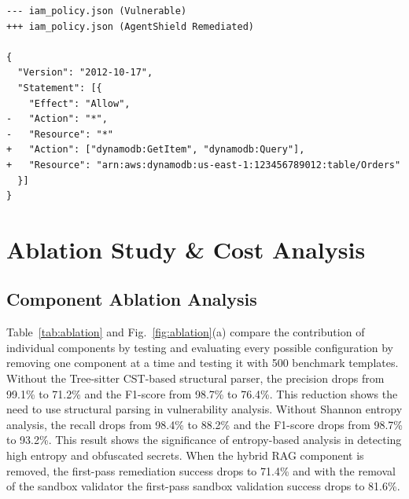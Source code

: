 \documentclass[runningheads]{llncs}
\begin{document}
\begin{lstlisting}[caption={Listing 2: IAM Least-Privilege Role Scoping \& Wildcard Neutralization.}, label={lst:iam}]
--- iam_policy.json (Vulnerable)
+++ iam_policy.json (AgentShield Remediated)

{
  "Version": "2012-10-17",
  "Statement": [{
    "Effect": "Allow",
-   "Action": "*",
-   "Resource": "*"
+   "Action": ["dynamodb:GetItem", "dynamodb:Query"],
+   "Resource": "arn:aws:dynamodb:us-east-1:123456789012:table/Orders"
  }]
}
\end{lstlisting}


\section{Ablation Study \& Cost Analysis}

\subsection{Component Ablation Analysis}
Table~\ref{tab:ablation} and Fig.~\ref{fig:ablation}(a) compare the contribution of individual components by testing and evaluating every possible configuration by removing one component at a time and testing it with 500 benchmark templates. Without the Tree-sitter CST-based structural parser, the precision drops from 99.1\% to 71.2\% and the F1-score from 98.7\% to 76.4\%. This reduction shows the need to use structural parsing in vulnerability analysis. Without Shannon entropy analysis, the recall drops from 98.4\% to 88.2\% and the F1-score drops from 98.7\% to 93.2\%. This result shows the significance of entropy-based analysis in detecting high entropy and obfuscated secrets. When the hybrid RAG component is removed, the first-pass remediation success drops to 71.4\% and with the removal of the sandbox validator the first-pass sandbox validation success drops to 81.6\%.
\end{document}
